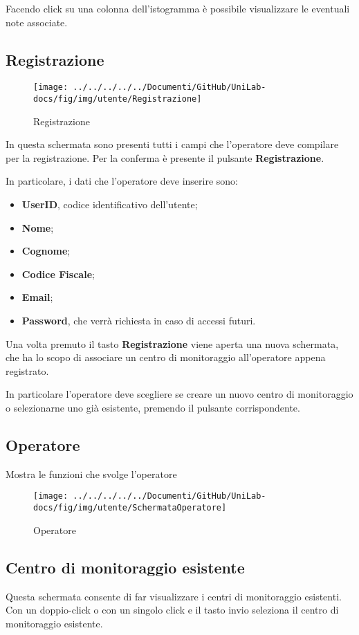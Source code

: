 Facendo click su una colonna dell'istogramma è possibile visualizzare le eventuali note associate.

\subsection{Registrazione}

\begin{figure}[h]
	\centering
	\texttt{[image: ../../../../../Documenti/GitHub/UniLab-docs/fig/img/utente/Registrazione]}
	\caption{Registrazione}
	\label{fig:registrazione}
\end{figure}

In questa schermata sono presenti tutti i campi che l'operatore deve compilare per la registrazione. Per la conferma è presente il pulsante \textbf{Registrazione}.

In particolare, i dati che l'operatore deve inserire sono:
\begin{itemize}
	\item  \textbf{UserID}, codice identificativo dell'utente;
	\item  \textbf{Nome};
	\item  \textbf{Cognome};
	\item  \textbf{Codice Fiscale};
	\item  \textbf{Email};
	\item  \textbf{Password}, che verrà richiesta in caso di accessi futuri.
\end{itemize}
Una volta premuto il tasto \textbf{Registrazione} viene aperta una nuova schermata, che ha lo scopo di associare un centro di monitoraggio all'operatore appena registrato.

In particolare l'operatore deve scegliere se creare un nuovo centro di monitoraggio o selezionarne uno già esistente, premendo il pulsante corrispondente.

\subsection{Operatore}
Mostra le funzioni che svolge l'operatore 
\begin{figure}[h]
	\centering
	\texttt{[image: ../../../../../Documenti/GitHub/UniLab-docs/fig/img/utente/SchermataOperatore]}
	\caption{Operatore}
	\label{fig:schermataoperatore}
\end{figure}

\pagebreak

\subsection{Centro di monitoraggio esistente}
Questa schermata consente di far visualizzare i centri di monitoraggio esistenti.
Con un doppio-click o con un singolo click e il tasto invio seleziona il centro di monitoraggio esistente.

